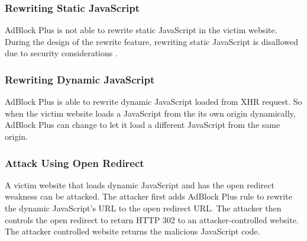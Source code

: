 \documentclass[conference]{IEEEtran}
\begin{document}
\subsubsection{Rewriting Static JavaScript}

AdBlock Plus is not able to rewrite static JavaScript in the victim website. During the design of the rewrite feature, rewriting static JavaScript is disallowed due to security considerations \cite{abp_issue_6622}.

\subsubsection{Rewriting Dynamic JavaScript}

AdBlock Plus is able to rewrite dynamic JavaScript loaded from XHR request. So when the victim website loads a JavaScript from the its own origin dynamically, AdBlock Plus can change to let it load a different JavaScript from the same origin.

\subsubsection{Attack Using Open Redirect}

A victim website that loads dynamic JavaScript and has the open redirect weakness can be attacked. The attacker first adds AdBlock Plus rule to rewrite the dynamic JavaScript's URL to the open redirect URL. The attacker then controls the open redirect to return HTTP 302 to an attacker-controlled website. The attacker controlled website returns the malicious JavaScript code.
\end{document}
